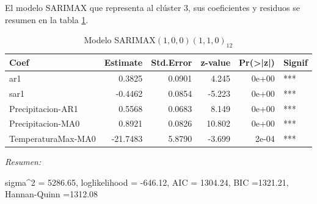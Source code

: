 \documentclass[12pt,oneside]{book}\usepackage[]{graphicx}\usepackage[]{color}
\newenvironment{knitrout}{}{} %
\theoremstyle{definition} %
\begin{document}
El modelo SARIMAX que representa al clúster 3, sus coeficientes y residuos se resumen en la tabla \ref{tab:sarimax_cl3}.




\begin{knitrout}
\color{fgcolor}\begin{table}

\caption{\label{tab:unnamed-chunk-107}\label{tab:sarimax_cl3}Modelo SARIMAX$(1,0,0)(1,1,0)_{12}$}
\centering
\begin{threeparttable}
\begin{tabular}[t]{lrrrrl}
\toprule
Coef & Estimate & Std.Error & z-value & Pr(>|z|) & Signif\\
\midrule
\rowcolor{gray!6}  ar1 & 0.3825 & 0.0901 & 4.245 & 0e+00 & ***\\
sar1 & -0.4462 & 0.0854 & -5.223 & 0e+00 & ***\\
\rowcolor{gray!6}  Precipitacion-AR1 & 0.5568 & 0.0683 & 8.149 & 0e+00 & ***\\
Precipitacion-MA0 & 0.8921 & 0.0826 & 10.802 & 0e+00 & ***\\
\rowcolor{gray!6}  TemperaturaMax-MA0 & -21.7483 & 5.8790 & -3.699 & 2e-04 & ***\\
\bottomrule
\end{tabular}
\begin{tablenotes}
\item \textit{Resumen:} 
\item sigma\textasciicircum{}2 = 5286.65, loglikelihood = -646.12, AIC = 1304.24, BIC =1321.21, Hannan-Quinn =1312.08
\end{tablenotes}
\end{threeparttable}
\end{table}


\end{knitrout}
\end{document}
